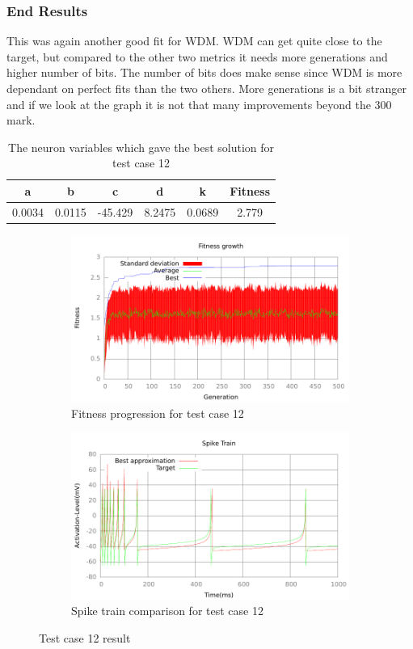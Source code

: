 \subsubsection{End Results}\label{sec:test-case-12-results}
This was again another good fit for WDM. WDM can get quite close to the target,
but compared to the other two metrics it needs more generations and higher
number of bits. The number of bits does make sense since WDM is more dependant
on perfect fits than the two others. More generations is a bit stranger and if
we look at the graph it is not that many improvements beyond the 300 mark.
\begin{table}
	\begin{tabular}{c c c c c c}
		a & b & c & d & k & Fitness \\
		\hline
		0.0034 & 0.0115 & -45.429 & 8.2475 & 0.0689 & 2.779
	\end{tabular}
	\caption{The neuron variables which gave the best solution for test case
	12}
\end{table}
\begin{figure}[h]
	\centering
	\begin{subfigure}[b]{0.5\textwidth}
		\includegraphics[width=\textwidth]{../output/wdm_izzy_4_fitness.pdf}
		\caption{Fitness progression for test case 12}
		\label{fig:fitness-test-case-12}
	\end{subfigure}%
	\begin{subfigure}[b]{0.5\textwidth}
		\includegraphics[width=\textwidth]{../output/wdm_izzy_4_spike.pdf}
		\caption{Spike train comparison for test case 12}
		\label{fig:spike-test-case-12}
	\end{subfigure}
	\caption{Test case 12 result}
\end{figure}
